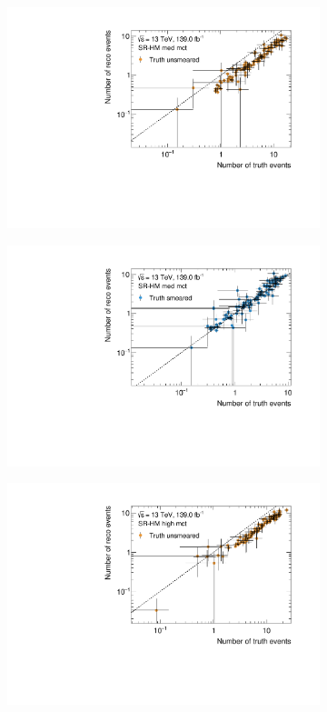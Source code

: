\begin{figure}
\begin{subfigure}[b]{0.49\linewidth}
	\end{subfigure}\hfill
	\begin{subfigure}[b]{0.49\linewidth}
		\centering\includegraphics[width=\textwidth]{yields_SR-HM_med_mct_unsmeared}
	\end{subfigure}\hfill
	\begin{subfigure}[b]{0.49\linewidth}
		\centering\includegraphics[width=\textwidth]{yields_SR-HM_med_mct_smeared}
	\end{subfigure}\hfill
	\begin{subfigure}[b]{0.49\linewidth}
		\centering\includegraphics[width=\textwidth]{yields_SR-HM_high_mct_unsmeared}

\end{subfigure}
\end{figure}
